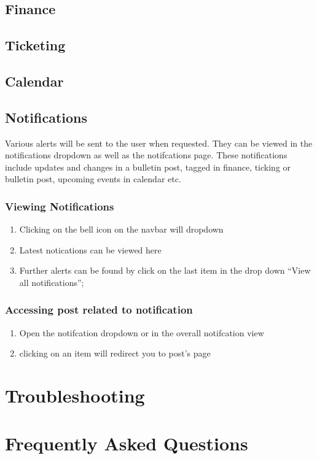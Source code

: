 \documentclass[12pt]{article}
\begin{document}
\subsection{Finance}

\subsection{Ticketing}

\subsection{Calendar}

\subsection{Notifications}
Various alerts will be sent to the user when requested. They can be viewed in the notifications dropdown as well as the notifcations page.
These notifications include updates and changes in a bulletin post, tagged in finance, ticking or bulletin post, upcoming events in calendar etc.
\subsubsection{Viewing Notifications}
\begin{enumerate}
\item Clicking on the bell icon on the navbar will dropdown
\item Latest notications can be viewed here
\item Further alerts can be found by click on the last item in the drop down ``View all notifications'';
\end{enumerate}
\subsubsection{Accessing post related to notification}
\begin{enumerate}
\item Open the notifcation dropdown or in the overall notifcation view
\item clicking on an item will redirect you to post's page
\end{enumerate}



\section{Troubleshooting}

\section{Frequently Asked Questions}

\end{document}
